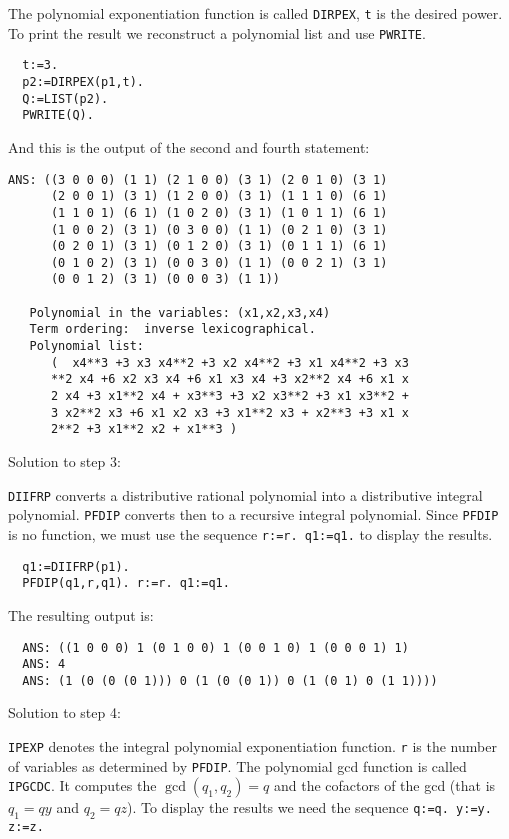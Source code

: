 The polynomial exponentiation function is 
called \verb/DIRPEX/, \verb/t/ is the  
desired power. 
To print the result we reconstruct a polynomial list 
and use \verb/PWRITE/.

{\footnotesize
\begin{verbatim}
  t:=3.
  p2:=DIRPEX(p1,t).
  Q:=LIST(p2).
  PWRITE(Q).
\end{verbatim}
}

And this is the output of the second and fourth statement:

{\footnotesize
\begin{verbatim}
ANS: ((3 0 0 0) (1 1) (2 1 0 0) (3 1) (2 0 1 0) (3 1) 
      (2 0 0 1) (3 1) (1 2 0 0) (3 1) (1 1 1 0) (6 1) 
      (1 1 0 1) (6 1) (1 0 2 0) (3 1) (1 0 1 1) (6 1) 
      (1 0 0 2) (3 1) (0 3 0 0) (1 1) (0 2 1 0) (3 1) 
      (0 2 0 1) (3 1) (0 1 2 0) (3 1) (0 1 1 1) (6 1) 
      (0 1 0 2) (3 1) (0 0 3 0) (1 1) (0 0 2 1) (3 1) 
      (0 0 1 2) (3 1) (0 0 0 3) (1 1))

   Polynomial in the variables: (x1,x2,x3,x4)
   Term ordering:  inverse lexicographical.
   Polynomial list: 
      (  x4**3 +3 x3 x4**2 +3 x2 x4**2 +3 x1 x4**2 +3 x3
      **2 x4 +6 x2 x3 x4 +6 x1 x3 x4 +3 x2**2 x4 +6 x1 x
      2 x4 +3 x1**2 x4 + x3**3 +3 x2 x3**2 +3 x1 x3**2 +
      3 x2**2 x3 +6 x1 x2 x3 +3 x1**2 x3 + x2**3 +3 x1 x
      2**2 +3 x1**2 x2 + x1**3 )
\end{verbatim}
}

Solution to step 3:

\verb/DIIFRP/ converts a distributive rational polynomial 
into a distributive integral polynomial. 
\verb/PFDIP/ converts then to a recursive integral polynomial.
Since \verb/PFDIP/ is no function, we must use the sequence 
\verb/r:=r. q1:=q1./ to display the results.

{\footnotesize
\begin{verbatim}
  q1:=DIIFRP(p1).
  PFDIP(q1,r,q1). r:=r. q1:=q1.
\end{verbatim}
}

The resulting output is:

{\footnotesize
\begin{verbatim}
  ANS: ((1 0 0 0) 1 (0 1 0 0) 1 (0 0 1 0) 1 (0 0 0 1) 1)
  ANS: 4
  ANS: (1 (0 (0 (0 1))) 0 (1 (0 (0 1)) 0 (1 (0 1) 0 (1 1))))
\end{verbatim}
}

Solution to step 4:

\verb/IPEXP/ denotes the integral polynomial exponentiation 
function. \verb/r/ is the number of variables as 
determined by \verb/PFDIP/. 
The polynomial gcd function is called 
\verb/IPGCDC/. It computes the $\gcd (q_1, q_2) = q$
and the cofactors of the gcd 
(that is $q_1 = q y$ and $q_2 = q z$).
To display the results we need the sequence 
\verb/q:=q. y:=y. z:=z./

